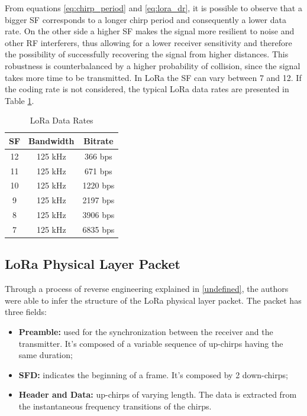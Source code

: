 From equations \ref{eq:chirp_period} and \ref{eq:lora_dr}, it is possible to observe that a bigger \gls{SF} corresponds to a longer chirp period and consequently a lower data rate. On the other side a higher \gls{SF} makes the signal more resilient to noise and other \gls{RF} interferers, thus allowing for a lower receiver sensitivity and therefore the possibility of successfully recovering the signal from higher distances. This robustness is counterbalanced by a higher probability of collision, since the signal takes more time to be transmitted. In LoRa the \gls{SF} can vary between 7 and 12. If the coding rate is not considered, the typical LoRa data rates are presented in Table \ref{tab:lora_dr}.

\begin{table}[]
\centering

\begin{tabular}{|c|c|c|}
\hline
\textbf{SF} & \textbf{Bandwidth} & \textbf{Bitrate} \\ \hline
 12 & 125 kHz & 366 bps  \\ \hline
 11 & 125 kHz & 671 bps \\ \hline
 10 & 125 kHz & 1220 bps \\ \hline
  9 & 125 kHz & 2197 bps \\ \hline
  8 & 125 kHz & 3906 bps \\ \hline 
  7 & 125 kHz & 6835 bps \\ \hline 
\end{tabular}
\caption{LoRa Data Rates}
\label{tab:lora_dr}

\end{table}

\subsection{LoRa Physical Layer Packet}

Through a process of reverse engineering explained in \ref{undefined}, the authors were able to infer the structure of the LoRa physical layer packet. The packet has three fields:

\begin{itemize}

\item \textbf{Preamble:} used for the synchronization between the receiver and the transmitter. It's composed of a variable sequence of up-chirps having the same duration;

\item \textbf{\gls{SFD}:} indicates the beginning of a frame. It's composed by 2 down-chirps;

\item \textbf{Header and Data:} up-chirps of varying length. The data is extracted from the instantaneous frequency transitions of the chirps.

\end{itemize}

